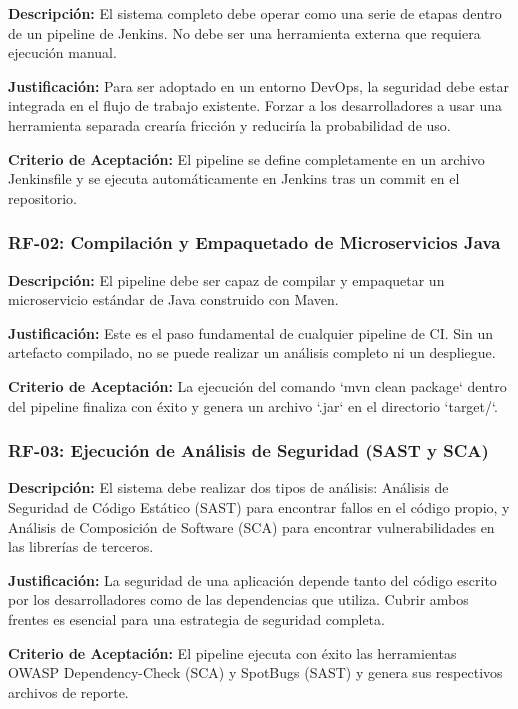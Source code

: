 \textbf{Descripción:} El sistema completo debe operar como una serie de etapas dentro de un pipeline de Jenkins. No debe ser una herramienta externa que requiera ejecución manual.

\textbf{Justificación:} Para ser adoptado en un entorno DevOps, la seguridad debe estar integrada en el flujo de trabajo existente. Forzar a los desarrolladores a usar una herramienta separada crearía fricción y reduciría la probabilidad de uso.

\textbf{Criterio de Aceptación:} El pipeline se define completamente en un archivo Jenkinsfile y se ejecuta automáticamente en Jenkins tras un commit en el repositorio.

\subsubsection{RF-02: Compilación y Empaquetado de Microservicios Java}

\textbf{Descripción:} El pipeline debe ser capaz de compilar y empaquetar un microservicio estándar de Java construido con Maven.

\textbf{Justificación:} Este es el paso fundamental de cualquier pipeline de CI. Sin un artefacto compilado, no se puede realizar un análisis completo ni un despliegue.

\textbf{Criterio de Aceptación:} La ejecución del comando `mvn clean package` dentro del pipeline finaliza con éxito y genera un archivo `.jar` en el directorio `target/`.

\subsubsection{RF-03: Ejecución de Análisis de Seguridad (SAST y SCA)}

\textbf{Descripción:} El sistema debe realizar dos tipos de análisis: Análisis de Seguridad de Código Estático (SAST) para encontrar fallos en el código propio, y Análisis de Composición de Software (SCA) para encontrar vulnerabilidades en las librerías de terceros.

\textbf{Justificación:} La seguridad de una aplicación depende tanto del código escrito por los desarrolladores como de las dependencias que utiliza. Cubrir ambos frentes es esencial para una estrategia de seguridad completa.

\textbf{Criterio de Aceptación:} El pipeline ejecuta con éxito las herramientas OWASP Dependency-Check (SCA) y SpotBugs (SAST) y genera sus respectivos archivos de reporte.

